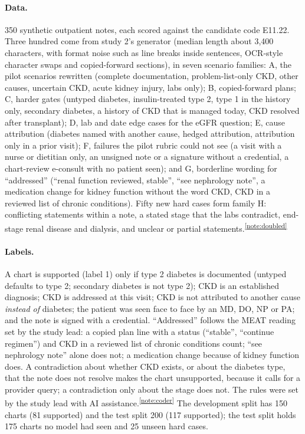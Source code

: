 \documentclass[10pt,letterpaper]{article}
\newcommand{\tnote}[1]{\textsuperscript{\hyperref[note:#1]{\ref*{note:#1}}}}
\begin{document}
\paragraph{Data.} 350 synthetic outpatient notes, each scored against the candidate code E11.22. Three hundred come from study 2's generator (median length about 3,400 characters, with format noise such as line breaks inside sentences, OCR-style character swaps and copied-forward sections), in seven scenario families:
A, the pilot scenarios rewritten (complete documentation, problem-list-only CKD, other causes, uncertain CKD, acute kidney injury, labs only);
B, copied-forward plans;
C, harder gates (untyped diabetes, insulin-treated type 2, type 1 in the history only, secondary diabetes, a history of CKD that is managed today, CKD resolved after transplant);
D, lab and date edge cases for the eGFR question;
E, cause attribution (diabetes named with another cause, hedged attribution, attribution only in a prior visit);
F, failures the pilot rubric could not see (a visit with a nurse or dietitian only, an unsigned note or a signature without a credential, a chart-review e-consult with no patient seen); and
G, borderline wording for ``addressed'' (``renal function reviewed, stable'', ``see nephrology note'', a medication change for kidney function without the word CKD, CKD in a reviewed list of chronic conditions).
Fifty new hard cases form family H: conflicting statements within a note, a stated stage that the labs contradict, end-stage renal disease and dialysis, and unclear or partial statements.\tnote{doubled}

\paragraph{Labels.} A chart is supported (label 1) only if type 2 diabetes is documented (untyped defaults to type 2; secondary diabetes is not type 2); CKD is an established diagnosis; CKD is addressed at this visit; CKD is not attributed to another cause \emph{instead of} diabetes; the patient was seen face to face by an MD, DO, NP or PA; and the note is signed with a credential. ``Addressed'' follows the MEAT reading set by the study lead: a copied plan line with a status (``stable'', ``continue regimen'') and CKD in a reviewed list of chronic conditions count; ``see nephrology note'' alone does not; a medication change because of kidney function does. A contradiction about whether CKD exists, or about the diabetes type, that the note does not resolve makes the chart unsupported, because it calls for a provider query; a contradiction only about the stage does not. The rules were set by the study lead with AI assistance.\tnote{coder} The development split has 150 charts (81 supported) and the test split 200 (117 supported); the test split holds 175 charts no model had seen and 25 unseen hard cases.
\end{document}
